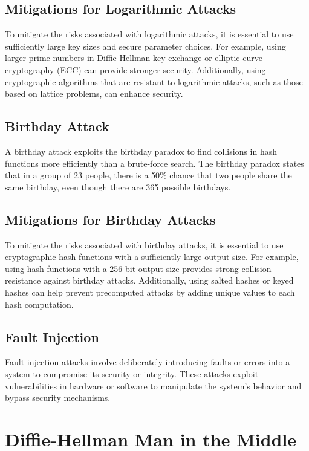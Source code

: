 \subsection*{Mitigations for Logarithmic Attacks}
To mitigate the risks associated with logarithmic attacks, it is essential to use sufficiently large key sizes and secure parameter choices. For example, using larger prime numbers in Diffie-Hellman key exchange or elliptic curve cryptography (ECC) can provide stronger security. Additionally, using cryptographic algorithms that are resistant to logarithmic attacks, such as those based on lattice problems, can enhance security.

\begin{center}
    \section{Birthday Attack}
\end{center}
A birthday attack exploits the birthday paradox to find collisions in hash functions more efficiently than a brute-force search. The birthday paradox states that in a group of 23 people, there is a 50\% chance that two people share the same birthday, even though there are 365 possible birthdays.

\subsection*{Mitigations for Birthday Attacks}
To mitigate the risks associated with birthday attacks, it is essential to use cryptographic hash functions with a sufficiently large output size. For example, using hash functions with a 256-bit output size provides strong collision resistance against birthday attacks. Additionally, using salted hashes or keyed hashes can help prevent precomputed attacks by adding unique values to each hash computation.

\begin{center}
    \section{Fault Injection}
\end{center}
Fault injection attacks involve deliberately introducing faults or errors into a system to compromise its security or integrity. These attacks exploit vulnerabilities in hardware or software to manipulate the system's behavior and bypass security mechanisms.


\section{Diffie-Hellman Man in the Middle}


